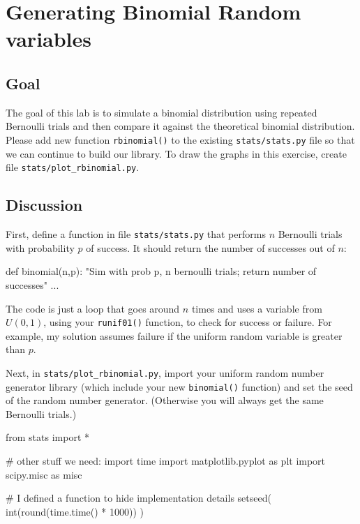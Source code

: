 \chapter{Generating Binomial Random variables}

\setcounter{problem}{1}
\section{Goal}

\begin{fullwidth}

The goal of this lab is to simulate a binomial distribution using repeated Bernoulli trials and then compare it against the theoretical binomial distribution. Please add new function {\tt rbinomial()} to the existing {\tt stats/stats.py} file so that we can continue to build our library. To draw the graphs in this exercise, create file {\tt stats/plot\_rbinomial.py}.

\section{Discussion}

\step First, define a function in file {\tt stats/stats.py} that performs $n$ Bernoulli trials with probability $p$ of success. It should return the number of successes out of $n$:

\begin{pyverbatim}
def binomial(n,p):
    "Sim with prob p, n bernoulli trials; return number of successes"
    ...
\end{pyverbatim}

The code is just a loop that goes around $n$ times and uses a variable from $U(0,1)$, using your {\tt runif01()} function, to check for success or failure. For example, my solution assumes failure if the uniform random variable is greater than $p$.
    
\step Next, in {\tt stats/plot\_rbinomial.py}, import your uniform random number generator library (which include your new {\tt binomial()} function) and set the seed of the random number generator. (Otherwise you will always get the same Bernoulli trials.) 

\begin{pyverbatim}
from stats import *

# other stuff we need:
import time
import matplotlib.pyplot as plt
import scipy.misc as misc

# I defined a function to hide implementation details
setseed( int(round(time.time() * 1000)) )
\end{pyverbatim}


\end{fullwidth}
